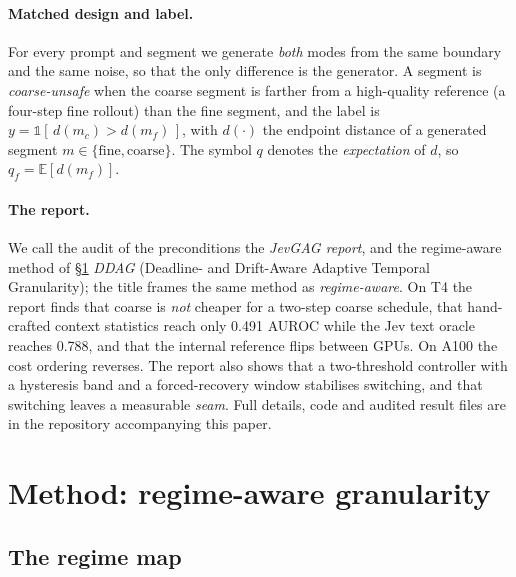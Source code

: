\documentclass[review]{cas-sc}          %
\begin{document}
\paragraph{Matched design and label.}
For every prompt and segment we generate \emph{both} modes from the same boundary and the same noise, so
that the only difference is the generator. A segment is \emph{coarse-unsafe} when the coarse segment is
farther from a high-quality reference (a four-step fine rollout) than the fine segment, and the label is
$y = \mathbb{1}[\,d(m_c) > d(m_f)\,]$, with $d(\cdot)$ the endpoint distance of a generated segment
$m \in \{\text{fine},\text{coarse}\}$. The symbol $q$ denotes the \emph{expectation} of $d$, so
$q_f = \mathbb{E}[d(m_f)]$.

\paragraph{The report.}
We call the audit of the preconditions the \emph{JevGAG report}, and the regime-aware method of
\S\ref{sec:method} \emph{DDAG} (Deadline- and Drift-Aware Adaptive Temporal Granularity); the title
frames the same method as \emph{regime-aware}. On T4 the report finds that coarse is \emph{not} cheaper
for a two-step coarse schedule, that hand-crafted context statistics reach only 0.491 AUROC while the Jev
text oracle reaches 0.788, and that the internal reference flips between GPUs. On A100 the cost ordering
reverses. The report also shows that a two-threshold controller with a hysteresis band and a
forced-recovery window stabilises switching, and that switching leaves a measurable \emph{seam}. Full
details, code and audited result files are in the repository accompanying this paper.

\section{Method: regime-aware granularity}
\label{sec:method}

\subsection{The regime map}
\label{sec:regimemap}
\end{document}
